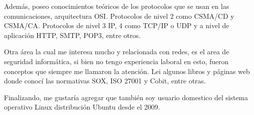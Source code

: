 \hspace{0.5cm}
Además, poseo conocimientos teóricos de los protocolos que se usan en las comunicaciones, arquitectura OSI. Protocolos de nivel 2 como CSMA/CD y CSMA/CA. Protocolos de nivel 3 IP, 4 como TCP/IP o UDP y a nivel de aplicación HTTP, SMTP, POP3, entre otros.

\hspace{0.5cm}
Otra área la cual me interesa mucho y relacionada con redes, es el area de seguridad informática, si bien no tengo
experiencia laboral en esto, fueron conceptos que siempre me llamaron la atención. Lei algunos libros y páginas
web donde conocí las normativas SOX, ISO 27001 y Cobit, entre otras.

\hspace{0.5cm}
Finalizando, me gustaría agregar que también soy usuario domestico del sistema operativo Linux distribución Ubuntu desde el 2009.
